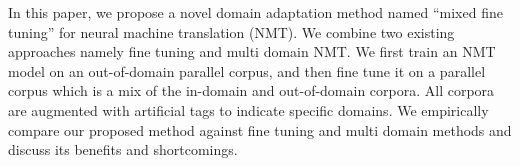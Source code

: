 In this paper, we propose a novel domain adaptation method named ``mixed fine tuning'' for neural machine translation (NMT). We combine two existing approaches namely fine tuning and multi domain NMT. We first train an NMT model on an out-of-domain parallel corpus, and then fine tune it on a parallel corpus which is a mix of the in-domain and out-of-domain corpora. All corpora are augmented with artificial tags to indicate specific domains. We empirically compare our proposed method against fine tuning and multi domain methods and discuss its benefits and shortcomings.
